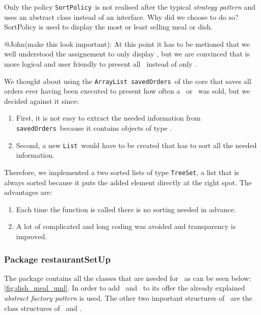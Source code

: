 Only the policy \lstinline|SortPolicy|~is not realised after the typical \emph{strategy pattern} and uses an abstract class instead of an interface. Why did we choose to do so? SortPolicy is used to display the most or least selling meal or dish. 

@John(make this look important): At this point it has to be metioned that we well understood the assignement to only display \HalfMeal, but we are convinced that is more logical and user friendly to present all \Meal~instead of only \HalfMeal. 

We thought about using the \lstinline|ArrayList|~\lstinline|savedOrders|~of the core that saves all orders ever having been executed to present how often a \Meal~or \Dish~was sold, but we decided against it since: 

\begin{enumerate}
	\item First, it is not easy to extract the needed information from \lstinline|savedOrders|~because it contains objects of type \Order.
	\item Second, a new \lstinline|List|~would have to be created that has to sort all the needed information.
\end{enumerate}

Therefore, we implemented a two sorted lists of type \lstinline|TreeSet|, a list that is always sorted because it puts the added element directly at the right spot. The advantages are:

\begin{enumerate}
	\item Each time the function is called there is no sorting needed in advance.
	\item A lot of complicated and long coding was avoided and transparency is improved.
\end{enumerate}


\subsubsection{Package restaurantSetUp} %
\label{ssub:restaurantsetup}

The package \restaurantSetup contains all the classes that are needed for \Restaurant~as can be seen below:  \ref{fig:dish_meal_uml}.
In order to add \Dish~and \Meal~to its offer the already explained \emph{abstract factory pattern} is used. The other two important structures of \restaurantSetup~are the class structures of \Meal~and \Dish. 


